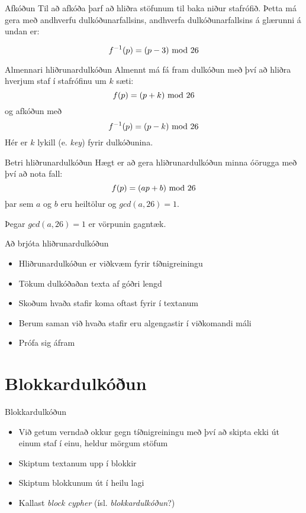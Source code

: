 \documentclass[handout]{beamer}
\begin{document}
\begin{frame}{Afkóðun}
Til að afkóða þarf að hliðra stöfunum til baka niður stafrófið. Þetta má gera með andhverfu dulkóðunarfallsins, andhverfa dulkóðunarfallsins á glærunni á undan er:

\[
 f^{-1}(p) = (p-3)\ \text{mod}\ 26
\]
\end{frame}

\begin{frame}{Almennari hliðrunardulkóðun}
Almennt má fá fram dulkóðun með því að hliðra hverjum staf í stafrófinu um $k$ sæti:
\[
 f(p) = (p + k) \ \text{mod}\ 26
\]
og afkóðun með
\[
 f^{-1}(p) = (p - k) \ \text{mod}\ 26
\]
Hér er $k$ lykill (e. \emph{key}) fyrir dulkóðunina.
\end{frame}

\begin{frame}{Betri hliðrunardulkóðun}
Hægt er að gera hliðrunardulkóðun minna óörugga með því að nota fall:
\[
 f(p) = (ap + b)\ \text{mod}\ 26
\]
þar sem $a$ og $b$ eru heiltölur og $gcd(a,26) = 1$. 

Þegar $gcd(a,26) = 1$ er vörpunin gagntæk.
\end{frame}

\begin{frame}{Að brjóta hliðrunardulkóðun}
\begin{itemize}
 \item Hliðrunardulkóðun er viðkvæm fyrir tíðnigreiningu
 \item Tökum dulkóðaðan texta af góðri lengd
 \item Skoðum hvaða stafir koma oftast fyrir í textanum
 \item Berum saman við hvaða stafir eru algengastir í viðkomandi máli
 \item Prófa sig áfram
\end{itemize}
\end{frame}

\section{Blokkardulkóðun}

\begin{frame}{Blokkardulkóðun}
\begin{itemize}
 \item Við getum verndað okkur gegn tíðnigreiningu með því að skipta ekki út einum staf í einu, heldur mörgum stöfum
 \item Skiptum textanum upp í blokkir
 \item Skiptum blokkunum út í heilu lagi
 \item Kallast \emph{block cypher} (ísl. \emph{blokkardulkóðun}?)
\end{itemize}
\end{frame}
\end{document}
